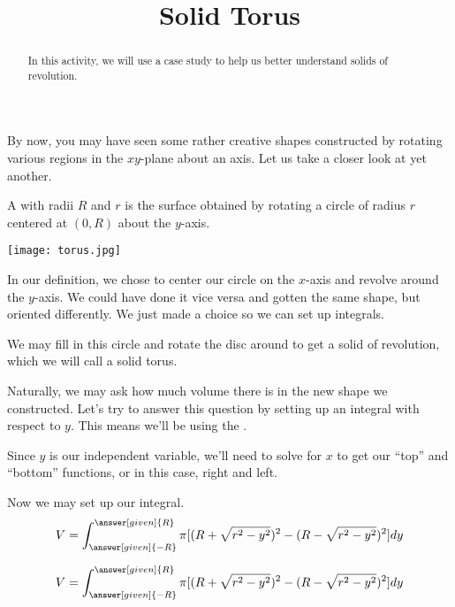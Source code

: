 \documentclass{ximera}
\title{Solid Torus}
\begin{document}
\begin{abstract}
In this activity, we will use a case study to help us better understand solids of revolution.
\end{abstract}
\maketitle

By now, you may have seen some rather creative shapes constructed by rotating various regions in the $xy$-plane about an axis. Let us take a closer look at yet another.
\begin{definition}
	A  with radii $R$ and $r$ is the surface obtained by rotating a circle of radius $r$ centered at $(0,R)$ about the $y$-axis.
\end{definition}

\begin{image}
	\label{torus}
	\texttt{[image: torus.jpg]}
\end{image}

\begin{remark}
	In our definition, we chose to center our circle on the $x$-axis and revolve around the $y$-axis. We could have done it vice versa and gotten the same shape, but oriented differently. We just made a choice so we can set up integrals.
\end{remark} 

We may fill in this circle and rotate the disc around to get a solid of revolution, which we will call a solid torus.

\begin{exercise}
	Naturally, we may ask how much volume there is in the new shape we constructed. Let's try to answer this question by setting up an integral with respect to $y$. This means we'll be using the  .
	
	Since $y$ is our independent variable, we'll need to solve for $x$ to get our ``top'' and ``bottom'' functions, or in this case, right and left.
	
	\begin{prompt}
	\begin{exercise}
		Now we may set up our integral.
		\begin{align*}
			V  &= \int_{\answer[given]{-R}}^{\answer[given]{R}} \pi [ (R+\sqrt{r^2-y^2})^{2}-(R-\sqrt{r^2-y^2})^{2}] dy \\
		\end{align*}
	\end{exercise}
	
	\begin{exercise}
		\begin{align*}
			V  &= \int_{\answer[given]{-R}}^{\answer[given]{R}} \pi [ (R+\sqrt{r^2-y^2})^{2}-(R-\sqrt{r^2-y^2})^{2}] dy \\
		\end{align*}
	\end{exercise}
	\end{prompt}
\end{exercise}
\end{document}
